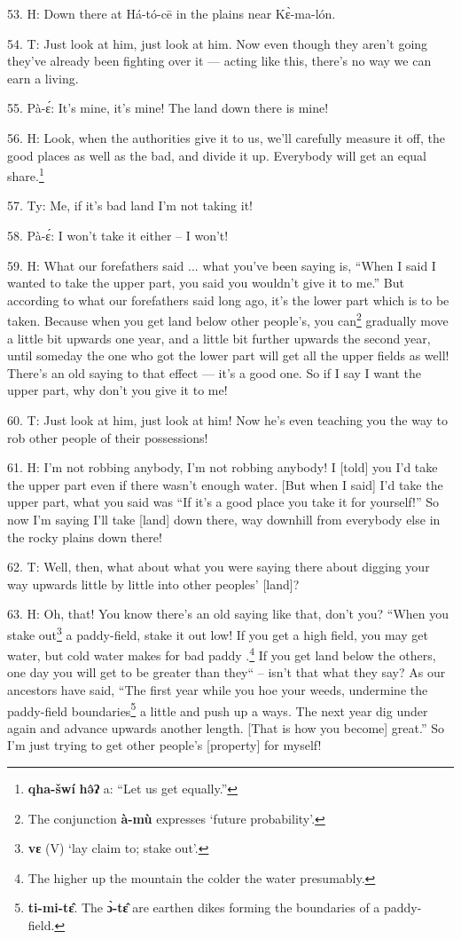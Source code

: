 53. H: Down there at Há-tó-cē in the plains near Kɛ̀-ma-lón.

54. T: Just look at him, just look at him. Now even though they aren't going
they've already been fighting over it --- acting like this, there's no way we can
earn a living.

55. Pà-ɛ́: It's mine, it's mine! The land down there is mine!

56. H: Look, when the authorities give it to us, we'll carefully measure it off,
the good places as well as the bad, and divide it up. Everybody will get an equal
share.\footnote{\textbf{qha-šwí} \textbf{hə̂ʔ} a: ``Let us get equally.''}

57. Ty: Me, if it's bad land I'm not taking it!

58. Pà-ɛ́: I won't take it either -- I won't!

59. H: What our forefathers said ... what you've been saying is, ``When I said I
wanted to take the upper part, you said you wouldn't give it to me.'' But according
to what our forefathers said long ago, it's the lower part which is to be taken.
Because when you get land below other people's, you can\footnote{The conjunction \textbf{à-mù} expresses `future probability'.} gradually move a little
bit upwards one year, and a little bit further upwards the second year, until someday
the one who got the lower part will get all the upper fields as well! There's an
old saying to that effect --- it's a good one. So if I say I want the upper part,
why don't you give it to me!

60. T: Just look at him, just look at him! Now he's even teaching you the way
to rob other people of their possessions!

61. H: I'm not robbing anybody, I'm not robbing anybody! I [told] you I'd take the
upper part even if there wasn't enough water. [But when I said] I'd take the upper
part, what you said was ``If it's a good place you take it for yourself!''
So now I'm saying I'll take [land] down there, way downhill from everybody else
in the rocky plains down there!

62. T: Well, then, what about what you were saying there about digging your
way upwards little by little into other peoples' [land]?

63. H:  Oh, that! You know there's an old saying like
that, don't you? ``When you stake out\footnote{\textbf{vɛ} (V) `lay claim to; stake out'.} a paddy-field, stake it out
low! If you get a high field, you may get water, but cold water makes for bad paddy
.\footnote{The higher up the mountain the colder the water presumably.} If you get land below the others, one day you will get to be greater than
they`` -- isn't that what they say? As our ancestors have said, ``The
first year while you hoe your weeds, undermine the paddy-field boundaries\footnote{\textbf{ti-mi-tɛ̂}. The \textbf{ɔ̀-tɛ̂} are earthen dikes forming the boundaries of a paddy-field.} a
little and push up a ways. The next year dig under again and advance upwards another
length. [That is how you become] great.'' So I'm just trying to get other
people's [property] for myself!

